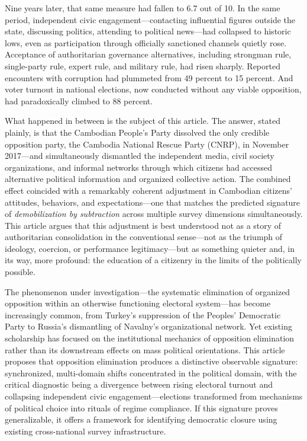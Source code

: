 \documentclass[Review,times,sageh,doublespace]{sagej}
\begin{document}
Nine years later, that same measure had fallen to 6.7 out of 10. In the
same period, independent civic engagement---contacting influential
figures outside the state, discussing politics, attending to political
news---had collapsed to historic lows, even as participation through
officially sanctioned channels quietly rose. Acceptance of authoritarian
governance alternatives, including strongman rule, single-party rule,
expert rule, and military rule, had risen sharply. Reported encounters
with corruption had plummeted from 49 percent to 15 percent. And voter
turnout in national elections, now conducted without any viable
opposition, had paradoxically climbed to 88 percent.

What happened in between is the subject of this article. The answer,
stated plainly, is that the Cambodian People's Party dissolved the only
credible opposition party, the Cambodia National Rescue Party (CNRP), in
November 2017---and simultaneously dismantled the independent media,
civil society organizations, and informal networks through which
citizens had accessed alternative political information and organized
collective action. The combined effect coincided with a remarkably
coherent adjustment in Cambodian citizens' attitudes, behaviors, and
expectations---one that matches the predicted signature of
\emph{demobilization by subtraction} across multiple survey dimensions
simultaneously. This article argues that this adjustment is best
understood not as a story of authoritarian consolidation in the
conventional sense---not as the triumph of ideology, coercion, or
performance legitimacy---but as something quieter and, in its way, more
profound: the education of a citizenry in the limits of the politically
possible.

The phenomenon under investigation---the systematic elimination of
organized opposition within an otherwise functioning electoral
system---has become increasingly common, from Turkey's suppression of
the Peoples' Democratic Party to Russia's dismantling of Navalny's
organizational network. Yet existing scholarship has focused on the
institutional mechanics of opposition elimination rather than its
downstream effects on mass political orientations. This article proposes
that opposition elimination produces a distinctive observable signature:
synchronized, multi-domain shifts concentrated in the political domain,
with the critical diagnostic being a divergence between rising electoral
turnout and collapsing independent civic engagement---elections
transformed from mechanisms of political choice into rituals of regime
compliance. If this signature proves generalizable, it offers a
framework for identifying democratic closure using existing
cross-national survey infrastructure.
\end{document}
